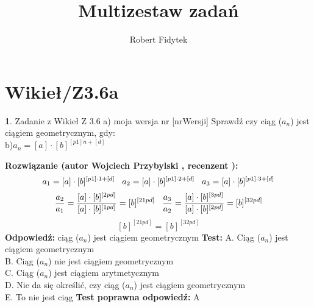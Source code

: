 \documentclass[12pt, a4paper]{article}
\title{Multizestaw zadań}
\author{Robert Fidytek}
\date{}
\theoremstyle{definition} %
\newtheorem{zad}{}
\newcommand{\kategoria}[1]{\section{#1}} %
\newcommand{\zadStart}[1]{\begin{zad}#1\newline} %
\newcommand{\zadStop}{\end{zad}}   %
\newcommand{\rozwStart}[2]{\noindent \textbf{Rozwiązanie (autor #1 , recenzent #2): }\newline} %
\newcommand{\rozwStop}{\newline}                                            %
\newcommand{\odpStart}{\noindent \textbf{Odpowiedź:}\newline}    %
\newcommand{\odpStop}{\newline}                                             %
\newcommand{\testStart}{\noindent \textbf{Test:}\newline} %
\newcommand{\testStop}{\newline} %
\newcommand{\kluczStart}{\noindent \textbf{Test poprawna odpowiedź:}\newline} %
\newcommand{\kluczStop}{\newline} %
\begin{document}
\maketitle


\kategoria{Wikieł/Z3.6a}
\zadStart{Zadanie z Wikieł Z 3.6 a) moja wersja nr [nrWersji]}
Sprawdź czy ciąg ($a_{n}$) jest ciągiem geometrycznym, gdy:\\
b)$a_{n}=[a]\cdot[b]^{[p1]n+[d]}$
\zadStop
\rozwStart{Wojciech Przybylski}{}
$$a_{1}=[a]\cdot[b]^{[p1]\cdot1+[d]}\hspace{3mm}a_{2}=[a]\cdot[b]^{[p1]\cdot2+[d]}\hspace{3mm}a_{3}=[a]\cdot[b]^{[p1]\cdot3+[d]} $$
$$\frac{a_{2}}{a_{1}}=\frac{[a]\cdot[b]^{[2pd]}}{[a]\cdot[b]^{[1pd]}}=[b]^{[21pd]}  \hspace{3mm} \frac{a_{3}}{a_{2}}=\frac{[a]\cdot[b]^{[3pd]}}{[a]\cdot[b]^{[2pd]}}=[b]^{[32pd]}  $$
$$[b]^{[21pd]}=[b]^{[32pd]} $$ 
\rozwStop
\odpStart
ciąg ($a_{n}$) jest ciągiem geometrycznym
\odpStop
\testStart
A. Ciąg ($a_{n}$) jest ciągiem geometrycznym\\
B. Ciąg ($a_{n}$) nie jest ciągiem geometrycznym\\
C. Ciąg ($a_{n}$) jest ciągiem arytmetycznym\\
D. Nie da się określić, czy ciąg ($a_{n}$) jest ciągiem geometrycznym\\
E. To nie jest ciąg
\testStop
\kluczStart
A
\kluczStop
\end{document}
